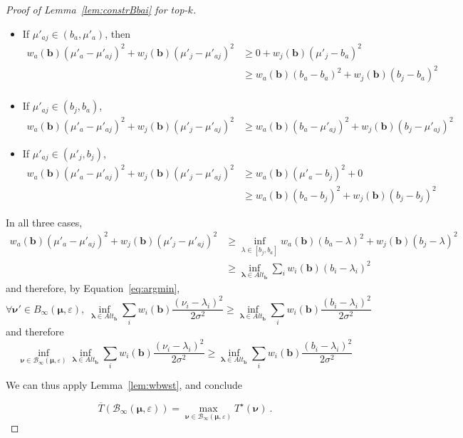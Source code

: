 \begin{proof}[Proof of Lemma~\ref{lem:constrBbai} for top-$k$]
	\begin{itemize}
		\item If $\mu'_{aj}\in (b_a,\mu'_a)$, then \begin{align*}
			w_a(\bm{b}) (\mu'_a-\mu'_{aj})^2+w_j(\bm{b}) (\mu'_j-\mu'_{aj})^2 &\geq 0+w_j(\bm{b}) (\mu'_j-b_a)^2 \\
			&\geq w_a(\bm{b})(b_a-b_a)^2+w_j(\bm{b})(b_j-b_a)^2\\
		\end{align*}
		\item If $\mu'_{aj}\in (b_j,b_a)$, \begin{align*}
			w_a(\bm{b}) (\mu'_a-\mu'_{aj})^2+w_j(\bm{b}) (\mu'_j-\mu'_{aj})^2 &\geq w_a(\bm{b})(b_a-\mu'_{aj})^2 +w_j(\bm{b})(b_j-\mu'_{aj})^2
		\end{align*}
		\item If $\mu'_{aj} \in (\mu'_j,b_j)$, \begin{align*} w_a(\bm{b}) (\mu'_a-\mu'_{aj})^2+w_j(\bm{b}) (\mu'_j-\mu'_{aj})^2 &\geq w_a(\bm{b})(\mu'_a-b_j)^2+0 \\
			&\geq w_a(\bm{b}) (b_a-b_j)^2 +w_j(\bm{b})(b_j-b_j)^2\end{align*}
	\end{itemize}
	In all three cases, \begin{align*} w_a(\bm{b}) (\mu'_a-\mu'_{aj})^2+w_j(\bm{b}) (\mu'_j-\mu'_{aj})^2 &\geq \inf_{\lambda\in [b_j,b_a]} w_a(\bm{b}) (b_a-\lambda)^2+w_j(\bm{b})(b_j-\lambda)^2\\
		&\geq \inf_{\bm{\lambda}\in Alt_{\bm b}} \sum_i w_i(\bm{b}) (b_i-\lambda_i)^2
	\end{align*}
	and therefore, by Equation~\eqref{eq:argmin}, \[\forall \bm\nu' \in B_{\infty}(\bm\mu, \varepsilon),\; \inf_{\bm{\lambda}\in Alt_{\bm b}} \sum_i w_i(\bm{b}) \frac{(\nu_i-\lambda_i)^2}{2\sigma^2}\geq \inf_{\bm{\lambda}\in Alt_{\bm b}} \sum_i w_i(\bm{b}) \frac{(b_i-\lambda_i)^2}{2\sigma^2} \] and therefore \begin{equation} \inf_{\bm\nu\in\mathcal B_{\infty}(\bm\mu, \varepsilon)}\inf_{\bm{\lambda}\in Alt_{\bm b}} \sum_i w_i(\bm{b}) \frac{(\nu_i-\lambda_i)^2}{2\sigma^2}\geq \inf_{\bm{\lambda}\in Alt_{\bm b}} \sum_i w_i(\bm{b}) \frac{(b_i-\lambda_i)^2}{2\sigma^2}\end{equation}
	
We can thus apply Lemma~\ref{lem:wbwst}, and conclude

\[\overline{T}(\mathcal B_{\infty}(\bm\mu, \varepsilon)) = \max_{\bm\nu\in \mathcal B_{\infty}(\bm\mu, \varepsilon)} T^\star(\bm\nu) \: .\]
\end{proof}









